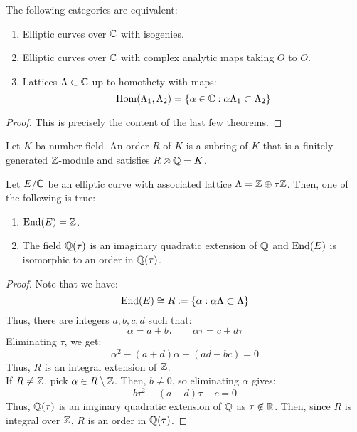 \documentclass[12pt]{article}
\begin{document}
\begin{theorem}
    The following categories are equivalent: 
    \begin{enumerate}
        \item Elliptic curves over $\mathbb C$ with isogenies.
        \item Elliptic curves over $\mathbb C$ with complex analytic maps taking $O$ to $O$. 
        \item Lattices $\Lambda \subset \mathbb C$ up to homothety with maps:
        \[ \operatorname{Hom}(\Lambda_1, \Lambda_2) = \{\alpha \in \mathbb C: \alpha \Lambda_1 \subset \Lambda_2\}\]
    \end{enumerate}
\end{theorem}
\begin{proof}
    This is precisely the content of the last few theorems.
\end{proof}

\begin{definition}
    Let $K$ ba number field. An order $R$ of $K$ is a subring of $K$ that is a finitely generated $\mathbb Z$-module and satisfies $R \otimes \mathbb Q = K$. 
\end{definition}

\begin{theorem}
    Let $E/\mathbb C$ be an elliptic curve with associated lattice $\Lambda = \mathbb Z \oplus \tau\mathbb Z$. Then, one of the following is true:
    \begin{enumerate}
        \item $\operatorname{End}(E) = \mathbb Z$. 
        \item The field $\mathbb Q(\tau)$ is an imaginary quadratic extension of $\mathbb Q$ and $\operatorname{End}(E)$ is isomorphic to an order in $\mathbb Q(\tau)$. 
    \end{enumerate}
\end{theorem}
\begin{proof}
    Note that we have:
    \[ \operatorname{End}(E) \cong R := \{\alpha: \alpha \Lambda \subset \Lambda\}\]
    Thus, there are integers $a, b, c, d$ such that:
    \[ \alpha = a + b \tau \qquad \alpha\tau = c+d\tau\]
    Eliminating $\tau$, we get: 
    \[\alpha^2 - (a+d)\alpha + (ad-bc) = 0\]
    Thus, $R$ is an integral extension of $\mathbb Z$. \\
    If $R \ne \mathbb Z$, pick $\alpha \in R\setminus \mathbb Z$. Then, $b \neq 0$, so eliminating $\alpha$ gives: 
    \[ b\tau^2 - (a-d)\tau -c = 0\]
    Thus, $\mathbb Q(\tau)$ is an imginary quadratic extension of $\mathbb Q$ as $\tau \not \in \mathbb R$. Then, since $R$ is integral over $\mathbb Z$, $R$ is an order in $\mathbb Q(\tau)$.
\end{proof}
\end{document}
